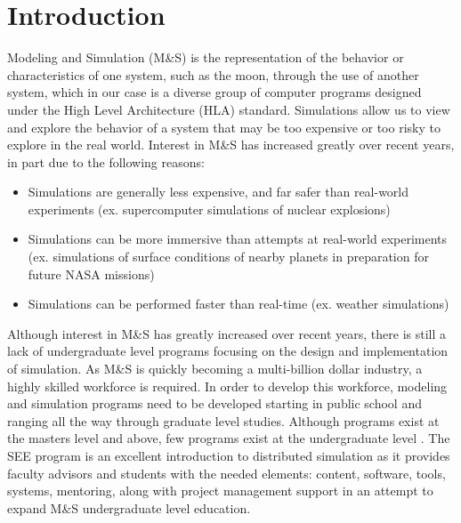 \documentclass[journal, onecolumn]{IEEEtran}
\begin{document}
%
\IEEEpeerreviewmaketitle

\section{Introduction}
Modeling and Simulation (M\&S) is the representation of the behavior or characteristics of one system, such as the moon, through the use of another system, which in our case is a diverse group of computer programs designed under the High Level Architecture (HLA) standard. Simulations allow us to view and explore the behavior of a system that may be too expensive or too risky to explore in the real world. Interest in M\&S has increased greatly over recent years, in part due to the following reasons:
\begin{itemize}
	\item Simulations are generally less expensive, and far safer than real-world experiments (ex. supercomputer simulations of nuclear explosions)
	\item Simulations can be more immersive than attempts at real-world experiments (ex. simulations of surface conditions of nearby planets in 
		preparation for future NASA missions)
	\item Simulations can be performed faster than real-time (ex. weather simulations)
\end{itemize}

Although interest in M\&S has greatly increased over recent years, there is still a lack of undergraduate level programs focusing on the design and implementation of simulation.  As M\&S is quickly becoming a multi-billion dollar industry, a highly skilled workforce is required.  In order to develop this workforce, modeling and simulation programs need to be developed starting in public school and ranging all the way through graduate level studies.  Although programs exist at the masters level and above, few programs exist at the undergraduate level \cite{banks2008compelling}.  The SEE program is an excellent introduction to distributed simulation as it provides faculty advisors and students with the needed elements: content, software, tools, systems, mentoring, along with project management support in an attempt to expand M\&S undergraduate level education.
\end{document}
